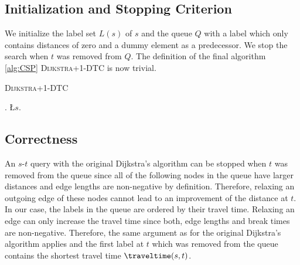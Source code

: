 \subsection{Initialization and Stopping Criterion}
We initialize the label set $L(s)$ of $s$ and the queue $Q$ with a label which only contains distances of zero and a dummy element as a predecessor. We stop the search when $t$ was removed from $Q$. The definition of the final algorithm \ref{alg:CSP} \textsc{Dijkstra+1-DTC} is now trivial.

\begin{algorithm}[bt]
	\caption{\textsc{Dijkstra+1-DTC}}\label{alg:CSP}

	\DontPrintSemicolon %



	\BlankLine
	\Q.\;
	\L{$s$}.\;
	\BlankLine
	{
		\settleNextLabel{}\;

		{
			\Return\;
		}
	}
\end{algorithm}

\subsection{Correctness\label{sec:dijkstra_csp_correctness}}
An $s$-$t$ query with the original Dijkstra's algorithm can be stopped when $t$ was removed from the queue since all of the following nodes in the queue have larger distances and edge lengths are non-negative by definition. Therefore, relaxing an outgoing edge of these nodes cannot lead to an improvement of the distance at $t$.
In our case, the labels in the queue are ordered by their travel time. Relaxing an edge can only increase the travel time since both, edge lengths and break times are non-negative. Therefore, the same argument as for the original Dijkstra's algorithm applies and the first label at $t$ which was removed from the queue contains the shortest travel time $\traveltime(s,t)$.

